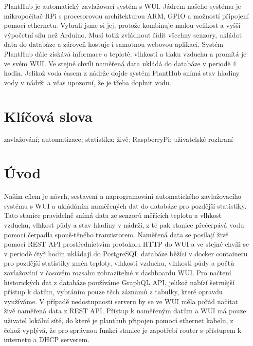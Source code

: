 \documentclass[12pt,a4paper]{article}
\begin{document}
PlantHub je automatický zavlažovací systém s \ac{WUI}.
Jádrem našeho systému je mikropočítač RPi s procesorovou architekturou ARM,
GPIO a možností připojení pomocí ethernetu.
Vybrali jsme si jej, protože kombinuje malou velikost a vyšší výpočetní sílu
než Arduino. Musí totiž zvládnout řídit všechny senzory, ukládat data do
databáze a zároveň hostuje i samotnou webovou aplikaci. Systém PlantHub dále
získává informace o teplotě, vlhkosti a tlaku vzduchu a promítá je ve svém
WUI. Ve stejné chvíli naměřená data ukládá do databáze v periodě 4
hodin. Jelikož voda časem z nádrže dojde systém PlantHub snímá stav hladiny
vody v nádrži a včas upozorní, že je třeba doplnit vodu.

\section*{Klíčová slova}

zavlažování; automatizace; statistika; živě; RaspberryPi; uživatelské rozhraní

\clearpage

\tableofcontents

\clearpage

\section{Úvod}

Naším cílem je návrh, sestavení a naprogramování automatického zavlažovacího
systému s \ac{WUI} a ukládáním naměřených dat do databáze
pro pozdější statistiky. Tato stanice pravidelně snímá data ze senzorů měřících
teplotu a vlhkost vzduchu, vlhkost půdy a stav hladiny v nádrži, z té pak
stanice přečerpává vodu pomocí čerpadla spouš-těného tranzistorem. Naměřená
data
se posílají živě pomocí REST API prostřednictvím
protokolu HTTP do \ac{WUI} a ve stejné
chvíli se v periodě čtyř hodin ukládají do PostgreSQL databáze běžící v docker
containeru pro pozdější
statistiky
změn teploty, vlhkosti vzduchu, vlhkosti půdy a počtů zavlažování v časovém
rozsahu zobrazitelné v dashboardu \ac{WUI}. Pro načtení historických dat z databáze
používáme GraphQL API, jelikož nabízí šetrnější přístup k datům, vybráním pouze
těch záznamů z tabulky, které opravdu využíváme. V případě nedostupnosti
serveru by se ve \ac{WUI} měla pořád načítat živě naměřená data z REST API. Přístup
k naměřeným datům a
\ac{WUI} má pouze
uživatel lokální
sítě, do které je planthub připojen pomocí ethernet kabelu, z čehož vyplývá, že
pro správnou funkci
stanice je zapotřebí router s přístupem k internetu a DHCP serverem.
\end{document}
